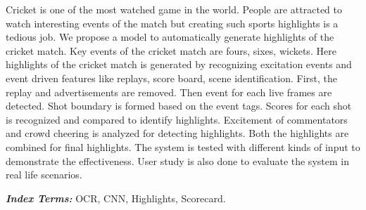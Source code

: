 	Cricket is one of the most watched game in the world.  People are attracted to watch interesting events of the match but creating such sports highlights is a tedious job. We propose a model to automatically generate highlights of the cricket match. Key events of the  cricket match are fours, sixes, wickets. Here highlights of the cricket match is generated by recognizing excitation events and event driven features like replays, score board, scene identification. First, the replay and advertisements are removed. Then event for each live frames are detected. Shot boundary is formed based on the event tags. Scores for each shot is recognized and compared to identify highlights. Excitement of commentators and crowd cheering is analyzed for detecting highlights. Both the highlights are combined for final highlights. The system is tested with different kinds of input to demonstrate the effectiveness. User study is also done to evaluate the system in real life scenarios.
	
	\textit{\textbf{Index Terms:}} OCR, CNN, Highlights, Scorecard.